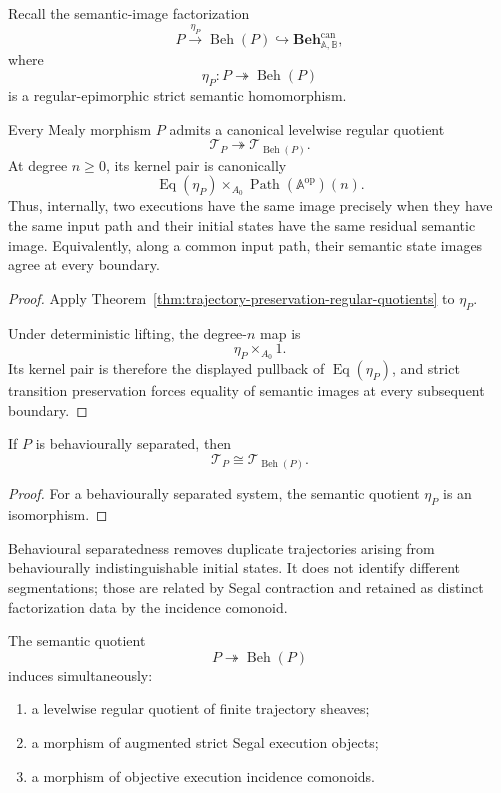 Recall the semantic-image factorization
\[
    P
    \xrightarrow{\eta_P}
    \operatorname{Beh}(P)
    \hookrightarrow
    \mathbf{Beh}^{\mathrm{can}}_{\mathbb A,\mathbb B},
\]
where
\[
    \eta_P:P\twoheadrightarrow\operatorname{Beh}(P)
\]
is a regular-epimorphic strict semantic homomorphism.

\begin{theorem}
\label{thm:behavioural-quotient-finite-trajectories}
Every Mealy morphism \(P\) admits a canonical levelwise regular quotient
\[
    \mathscr T_P
    \twoheadrightarrow
    \mathscr T_{\operatorname{Beh}(P)}.
\]
At degree \(n\geq0\), its kernel pair is canonically
\[
    \operatorname{Eq}(\eta_P)
    \times_{A_0}
    \operatorname{Path}(\mathbb A^{\mathrm{op}})(n).
\]
Thus, internally, two executions have the same image precisely when they
have the same input path and their initial states have the same residual
semantic image. Equivalently, along a common input path, their semantic state
images agree at every boundary.
\end{theorem}

\begin{proof}
Apply
Theorem~\ref{thm:trajectory-preservation-regular-quotients}
to \(\eta_P\).

Under deterministic lifting, the degree-\(n\) map is
\[
    \eta_P\times_{A_0}1.
\]
Its kernel pair is therefore the displayed pullback of
\(\operatorname{Eq}(\eta_P)\), and strict transition preservation forces
equality of semantic images at every subsequent boundary.
\end{proof}

\begin{corollary}
\label{cor:separated-trajectory-semantics}
If \(P\) is behaviourally separated, then
\[
    \mathscr T_P
    \cong
    \mathscr T_{\operatorname{Beh}(P)}.
\]
\end{corollary}

\begin{proof}
For a behaviourally separated system, the semantic quotient
\(\eta_P\) is an isomorphism.
\end{proof}

Behavioural separatedness removes duplicate trajectories arising from
behaviourally indistinguishable initial states. It does not identify
different segmentations; those are related by Segal contraction and retained
as distinct factorization data by the incidence comonoid.

\begin{theorem}
\label{thm:behavioural-minimization-structured-execution}
The semantic quotient
\[
    P\twoheadrightarrow\operatorname{Beh}(P)
\]
induces simultaneously:
\begin{enumerate}
    \item a levelwise regular quotient of finite trajectory sheaves;
    \item a morphism of augmented strict Segal execution objects;
    \item a morphism of objective execution incidence comonoids.
\end{enumerate}
\end{theorem}

